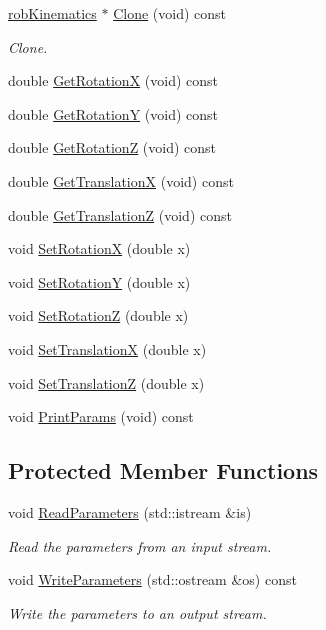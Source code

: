 \begin{DoxyCompactItemize}
\hyperlink{classrob_kinematics}{rob\-Kinematics} $\ast$ \hyperlink{classrob_modified_hayati_ab90f7548fb3995ef41a0c2349ef9f7db}{Clone} (void) const 
\begin{DoxyCompactList}\small\item\em Clone. \end{DoxyCompactList}\item 
double \hyperlink{classrob_modified_hayati_ac4d0b99a4bcaf84f7a230ca816a4df97}{Get\-Rotation\-X} (void) const 
\item 
double \hyperlink{classrob_modified_hayati_aa1717fcadff1ae71baae7e533d59a5c9}{Get\-Rotation\-Y} (void) const 
\item 
double \hyperlink{classrob_modified_hayati_a75e13e4379ca87e1a3bf1927eb6fe3fe}{Get\-Rotation\-Z} (void) const 
\item 
double \hyperlink{classrob_modified_hayati_a83119c072a7510d664e2ca5b936fe593}{Get\-Translation\-X} (void) const 
\item 
double \hyperlink{classrob_modified_hayati_a9955174220cae5588a5f207b873f3053}{Get\-Translation\-Z} (void) const 
\item 
void \hyperlink{classrob_modified_hayati_a200324621b9ffada977a5ab04565a857}{Set\-Rotation\-X} (double x)
\item 
void \hyperlink{classrob_modified_hayati_acc244d9c59715d99b3c49b435ddbb1d9}{Set\-Rotation\-Y} (double x)
\item 
void \hyperlink{classrob_modified_hayati_a5549a9381171d9ce5cca73f282ffabcf}{Set\-Rotation\-Z} (double x)
\item 
void \hyperlink{classrob_modified_hayati_aa280e443e4e6fbdc8d70e597a4234445}{Set\-Translation\-X} (double x)
\item 
void \hyperlink{classrob_modified_hayati_a82afe19aee6735e461589aa3df38a257}{Set\-Translation\-Z} (double x)
\item 
void \hyperlink{classrob_modified_hayati_a0d5d59f712f43dc403b9e5bee0810cc1}{Print\-Params} (void) const 
\end{DoxyCompactItemize}
\subsection*{Protected Member Functions}
\begin{DoxyCompactItemize}
\item 
void \hyperlink{classrob_modified_hayati_aabe09b18ecd7bf23a466d9855f17a431}{Read\-Parameters} (std\-::istream \&is)
\begin{DoxyCompactList}\small\item\em Read the parameters from an input stream. \end{DoxyCompactList}\item 
void \hyperlink{classrob_modified_hayati_a3e487aaa0708be391310862b0579d282}{Write\-Parameters} (std\-::ostream \&os) const 
\begin{DoxyCompactList}\small\item\em Write the parameters to an output stream. \end{DoxyCompactList}\end{DoxyCompactItemize}
